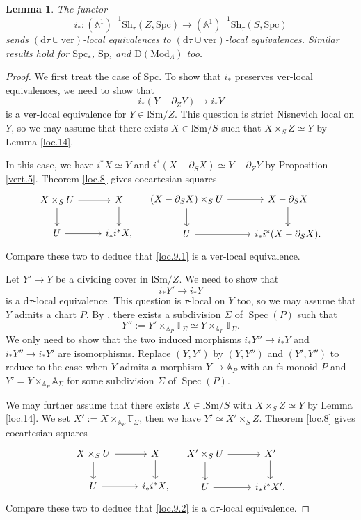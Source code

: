\documentclass[10pt]{amsart}
\newtheorem{lem}[thm]{Lemma}
\theoremstyle{definition}
\theoremstyle{remark}
\numberwithin{equation}{subsection}
\newcommand{\A}{\mathbb{A}}
\newcommand{\T}{\mathbb{T}}
\DeclareMathOperator{\Spec}{Spec}
\newcommand{\Spt}{\mathrm{Sp}}
\newcommand{\DLambda}{\mathrm{D}(\mathrm{Mod}_{\Lambda})}
\newcommand{\lSm}{\mathrm{lSm}}
\newcommand{\infShv}{\mathrm{Sh}}
\newcommand{\Spc}{\mathrm{Spc}}
\newcommand{\ver}{\mathrm{ver}}
\newcommand{\dtau}{\mathrm{d}\tau}
\begin{document}
\begin{lem}
\label{loc.9}
The functor
\[
i_*
\colon
(\A^1)^{-1}\infShv_{\tau}(Z,\Spc)
\to
(\A^1)^{-1}\infShv_{\tau}(S,\Spc)
\]
sends $(\dtau\cup\ver)$-local equivalences to $(\dtau\cup\ver)$-local equivalences.
Similar results hold for $\Spc_*$, $\Spt$, and $\DLambda$ too.
\end{lem}
\begin{proof}
We first treat the case of $\Spc$.
To show that $i_*$ preserves $\ver$-local equivalences, we need to show that
\begin{equation}
\label{loc.9.1}
i_*(Y-\partial_Z Y)\to i_*Y
\end{equation}
is a $\ver$-local equivalence for $Y\in \lSm/Z$.
This question is strict Nisnevich local on $Y$, so we may assume that there exists $X\in \lSm/S$ such that $X\times_S Z\simeq Y$ by Lemma \ref{loc.14}.

In this case, we have $i^*X\simeq Y$ and $i^*(X-\partial_S X)\simeq Y-\partial_Z Y$ by Proposition \ref{vert.5}.
Theorem \ref{loc.8} gives cocartesian squares
\[
\begin{tikzcd}
X\times_S U\ar[d]\ar[r]&
X\ar[d]
\\
U\ar[r]&
i_*i^*X,
\end{tikzcd}
\quad
\begin{tikzcd}
(X-\partial_S X)\times_S U\ar[d]\ar[r]&
X-\partial_S X\ar[d]
\\
U\ar[r]&
i_*i^*(X-\partial_S X).
\end{tikzcd}
\]
Compare these two to deduce that \eqref{loc.9.1} is a $\ver$-local equivalence.

Let $Y'\to Y$ be a dividing cover in $\lSm/Z$.
We need to show that
\begin{equation}
\label{loc.9.2}
i_*Y'\to i_*Y
\end{equation}
is a $\dtau$-local equivalence.
This question is $\tau$-local on $Y$ too, so we may assume that $Y$ admits a chart $P$.
By \cite[Proposition A.11.5]{logDM}, there exists a subdivision $\Sigma$ of $\Spec(P)$ such that 
\[
Y'':=Y'\times_{\A_P}\T_\Sigma
\simeq
Y\times_{\A_P}\T_\Sigma.
\]
We only need to show that the two induced morphisms $i_*Y''\to i_*Y$ and $i_*Y''\to i_*Y'$ are isomorphisms.
Replace $(Y,Y')$ by $(Y,Y'')$ and $(Y',Y'')$ to reduce to the case when $Y$ admits a morphism $Y\to \A_P$ with an fs monoid $P$ and $Y'=Y\times_{\A_P}\A_\Sigma$ for some subdivision $\Sigma$ of $\Spec(P)$.

We may further assume that there exists $X\in \lSm/S$ with $X\times_S Z\simeq Y$ by Lemma \ref{loc.14}.
We set $X':=X\times_{\A_P}\T_\Sigma$, then we have $Y'\simeq X'\times_S Z$.
Theorem \ref{loc.8} gives cocartesian squares
\[
\begin{tikzcd}
X\times_S U\ar[d]\ar[r]&
X\ar[d]
\\
U\ar[r]&
i_*i^*X,
\end{tikzcd}
\quad
\begin{tikzcd}
X'\times_S U\ar[d]\ar[r]&
X'\ar[d]
\\
U\ar[r]&
i_*i^*X'.
\end{tikzcd}
\]
Compare these two to deduce that \eqref{loc.9.2} is a $\dtau$-local equivalence.


\end{proof}
\end{document}

